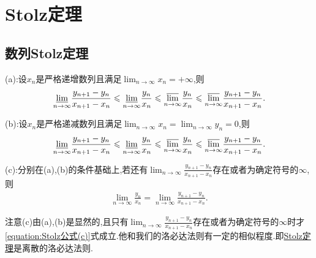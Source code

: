 \documentclass[../../main.tex]{subfiles}%
\begin{document}
\section{Stolz定理}

\subsection{数列Stolz定理}

\begin{theorem}[Stolz定理]\label{theorem:Stolz定理}
(a):设\(x_n\)是严格递增数列且满足\(\lim_{n \to \infty} x_n = +\infty\),则
\begin{align*}
\underset{n\rightarrow \infty}{{\varliminf }} \frac{y_{n + 1} - y_n}{x_{n + 1} - x_n} \leqslant \underset{n\rightarrow \infty}{{\varliminf }} \frac{y_n}{x_n} \leqslant \underset{n\rightarrow \infty}{{\varlimsup }} \frac{y_n}{x_n} \leqslant \underset{n\rightarrow \infty}{{\varlimsup }} \frac{y_{n + 1} - y_n}{x_{n + 1} - x_n}.
\end{align*}

(b):设\(x_n\)是严格递减数列且满足\(\lim_{n \to \infty} x_n = \lim_{n \to \infty} y_n = 0\),则
\begin{align*}
\underset{n\rightarrow \infty}{{\varliminf }} \frac{y_{n + 1} - y_n}{x_{n + 1} - x_n} \leqslant \underset{n\rightarrow \infty}{{\varliminf }} \frac{y_n}{x_n} \leqslant \underset{n\rightarrow \infty}{{\varlimsup }} \frac{y_n}{x_n} \leqslant \underset{n\rightarrow \infty}{{\varlimsup }} \frac{y_{n + 1} - y_n}{x_{n + 1} - x_n}.
\end{align*}

(c):分别在(a),(b)的条件基础上,若还有\(\lim_{n \to \infty} \frac{y_{n + 1} - y_n}{x_{n + 1} - x_n}\)存在或者为确定符号的\(\infty\),则
\begin{align}\label{equation:Stolz公式(c)}
\lim_{n \to \infty} \frac{y_n}{x_n} = \lim_{n \to \infty} \frac{y_{n + 1} - y_n}{x_{n + 1} - x_n} .
\end{align}
\end{theorem}
\begin{remark}
注意(c)由(a),(b)是显然的,且只有\(\lim_{n \to \infty} \frac{y_{n + 1} - y_n}{x_{n + 1} - x_n}\)存在或者为确定符号的\(\infty\)时才\eqref{equation:Stolz公式(c)}式成立.他和我们的洛必达法则有一定的相似程度.即\hyperref[theorem:Stolz定理]{Stolz定理}是离散的洛必达法则.
\end{remark}
\end{document}
